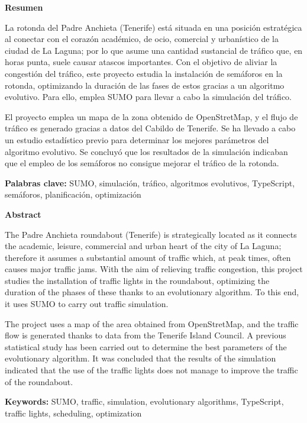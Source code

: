 \pagestyle{empty}

\begin{center}
    \textbf{Resumen}
\end{center}

La rotonda del Padre Anchieta (Tenerife) está situada en una posición estratégica al conectar con el corazón académico, de ocio, comercial y urbanístico de la ciudad de La Laguna; por lo que asume una cantidad sustancial de tráfico que, en horas punta, suele causar atascos importantes. Con el objetivo de aliviar la congestión del tráfico, este proyecto estudia la instalación de semáforos en la rotonda, optimizando la duración de las fases de estos gracias a un algoritmo evolutivo. Para ello, emplea SUMO para llevar a cabo la simulación del tráfico.

\medskip

El proyecto emplea un mapa de la zona obtenido de OpenStretMap, y el flujo de tráfico es generado gracias a datos del Cabildo de Tenerife. Se ha llevado a cabo un estudio estadístico previo para determinar los mejores parámetros del algoritmo evolutivo. Se concluyó que los resultados de la simulación indicaban que el empleo de los semáforos no consigue mejorar el tráfico de la rotonda.

\medskip

\noindent \textbf{Palabras clave:} SUMO, simulación, tráfico, algoritmos evolutivos, TypeScript, semáforos, planificación, optimización

\bigskip
\bigskip

\begin{center}
    \textbf{Abstract}
\end{center}

The Padre Anchieta roundabout (Tenerife) is strategically located as it connects the academic, leisure, commercial and urban heart of the city of La Laguna; therefore it assumes a substantial amount of traffic which, at peak times, often causes major traffic jams. With the aim of relieving traffic congestion, this project studies the installation of traffic lights in the roundabout, optimizing the duration of the phases of these thanks to an evolutionary algorithm. To this end, it uses SUMO to carry out traffic simulation.

\medskip

The project uses a map of the area obtained from OpenStretMap, and the traffic flow is generated thanks to data from the Tenerife Island Council. A previous statistical study has been carried out to determine the best parameters of the evolutionary algorithm. It was concluded that the results of the simulation indicated that the use of the traffic lights does not manage to improve the traffic of the roundabout.

\medskip

\noindent \textbf{Keywords:} SUMO, traffic, simulation, evolutionary algorithms, TypeScript, traffic lights, scheduling, optimization

